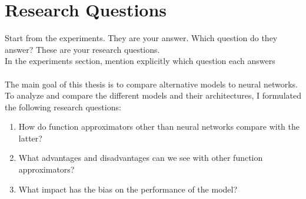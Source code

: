 \section{Research Questions}
\label{sec:research_questions}
Start from the experiments. They are your answer. Which question do they answer? These are your research questions. \\
In the experiments section, mention explicitly which question each answers \\ \\
The main goal of this thesis is to compare alternative models to neural networks. To analyze and compare the different models and their architectures, I formulated the following research questions:
\begin{enumerate}
  \item How do function approximators other than neural networks compare with the latter?
  \item What advantages and disadvantages can we see with other function approximators?
  \item What impact has the bias on the performance of the model?
\end{enumerate}

